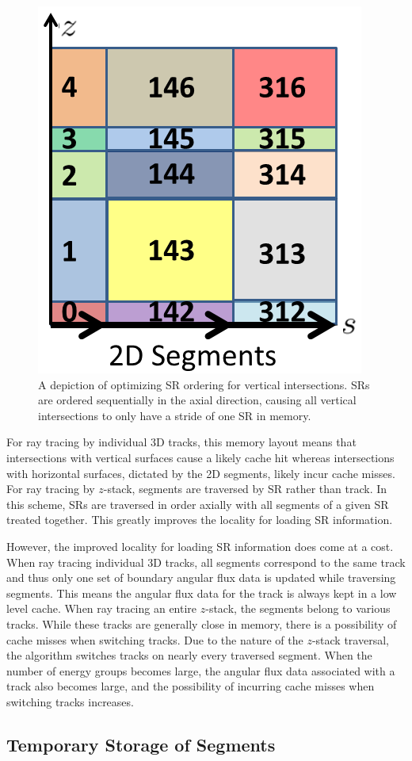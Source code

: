 \begin{figure}[ht!]
	\centering
	\includegraphics[width=0.4\linewidth]{figures/FSR_ordering_axial.PNG}
	\caption{A depiction of optimizing \ac{SR} ordering for vertical intersections. \ac{SR}s are ordered sequentially in the axial direction, causing all vertical intersections to only have a stride of one \ac{SR} in memory.}
	\label{fig:axial-fsr-ordering}
\end{figure}

For ray tracing by individual 3D tracks, this memory layout means that intersections with vertical surfaces cause a likely cache hit whereas intersections with horizontal surfaces, dictated by the 2D segments, likely incur cache misses. For ray tracing by $z$-stack, segments are traversed by \ac{SR} rather than track. In this scheme, \ac{SR}s are traversed in order axially with all segments of a given \ac{SR} treated together. This greatly improves the locality for loading \ac{SR} information.

However, the improved locality for loading \ac{SR} information does come at a cost. When ray tracing individual 3D tracks, all segments correspond to the same track and thus only one set of boundary angular flux data is updated while traversing segments. This means the angular flux data for the track is always kept in a low level cache. When ray tracing an entire $z$-stack, the segments belong to various tracks. While these tracks are generally close in memory, there is a possibility of cache misses when switching tracks. Due to the nature of the $z$-stack traversal, the algorithm switches tracks on nearly every traversed segment. When the number of energy groups becomes large, the angular flux data associated with a track also becomes large, and the possibility of incurring cache misses when switching tracks increases.

\subsection{Temporary Storage of Segments}

